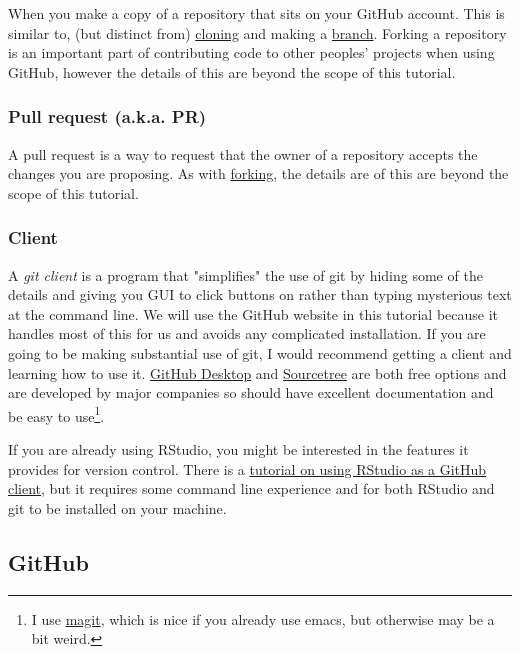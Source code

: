 \documentclass[11pt,onecolumn]{scrartcl}
\begin{document}
When you make a copy of a repository that sits on your GitHub account. This is
similar to, (but distinct from) \hyperref[sec:org434e06c]{cloning} and making a \hyperref[sec:orgb816f44]{branch}. Forking a
repository is an important part of contributing code to other peoples' projects
when using GitHub, however the details of this are beyond the scope of this
tutorial.

\subsubsection*{Pull request (a.k.a. PR)}
\label{sec:org0d091a7}

A pull request is a way to request that the owner of a repository accepts the
changes you are proposing. As with \hyperref[sec:orgef97574]{forking}, the details are of this are beyond
the scope of this tutorial.

\subsubsection*{Client}
\label{sec:org8497bad}

A \emph{git client} is a program that "simplifies" the use of git by hiding some of
the details and giving you GUI to click buttons on rather than typing mysterious
text at the command line. We will use the GitHub website in this tutorial
because it handles most of this for us and avoids any complicated installation.
If you are going to be making substantial use of git, I would recommend getting
a client and learning how to use it. \href{https://desktop.github.com/}{GitHub Desktop} and \href{https://www.sourcetreeapp.com/}{Sourcetree} are both free
options and are developed by major companies so should have excellent
documentation and be easy to use\footnote{I use \href{https://magit.vc/}{magit}, which is nice if you already use emacs, but otherwise may be a bit weird.}.

If you are already using RStudio, you might be interested in the features it
provides for version control. There is a \href{https://resources.github.com/github-and-rstudio/}{tutorial on using RStudio as a GitHub
client}, but it requires some command line experience and for both RStudio and
git to be installed on your machine.

\subsection{GitHub}
\label{sec:orga4dec31}
\end{document}
